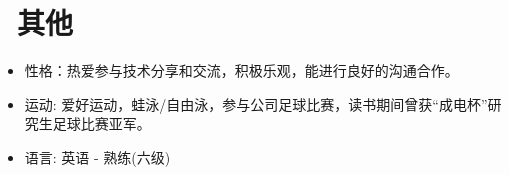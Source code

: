 \documentclass{resume}
\begin{document}
\section{\faInfo\  其他}
\begin{itemize}[parsep=0.5ex]
  \item 性格：热爱参与技术分享和交流，积极乐观，能进行良好的沟通合作。
  \item 运动: 爱好运动，蛙泳/自由泳，参与公司足球比赛，读书期间曾获“成电杯”研究生足球比赛亚军。
  \item 语言: 英语 - 熟练(六级)
\end{itemize}

%
%
\end{document}
